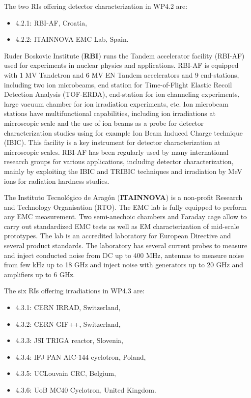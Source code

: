 The two RIs offering detector characterization in WP4.2 are:
\begin{itemize}
    \item	4.2.1: RBI-AF, Croatia,
    \item	4.2.2: ITAINNOVA EMC Lab, Spain.
\end{itemize}

Ruder Boskovic Institute (\textbf{RBI}) runs the Tandem accelerator facility (RBI-AF) used for experiments in nuclear physics and applications. RBI-AF is equipped with 1 MV Tandetron and 6 MV EN Tandem accelerators and 9 end-stations, including two ion microbeams, end station for Time-of-Flight Elastic Recoil Detection Analysis (TOF-ERDA), end-station for ion channeling experiments, large vacuum chamber for ion irradiation experiments, etc. Ion microbeam stations have multifunctional capabilities, including ion irradiations at microscopic scale and the use of ion beams as a probe for detector characterization studies using for example Ion Beam Induced Charge technique (IBIC). This facility is a key instrument for detector characterization at microscopic scales. RBI-AF has been regularly used by many international research groups for various applications, including detector characterization, mainly by exploiting the IBIC and TRIBIC techniques and irradiation by MeV ions for radiation hardness studies. 

The Instituto Tecnológico de Aragón (\textbf{ITAINNOVA}) is a non-profit Research and Technology Organisation (RTO). The EMC lab is fully equipped to perform any EMC measurement. Two
semi-anechoic chambers and Faraday cage allow to carry out standardized EMC tests as well as EM characterization of mid-scale prototypes. The lab is an accredited laboratory for European Directive and several product standards. The laboratory has several current probes to measure and inject conducted noise from DC up to 400 MHz, antennas to measure noise from few kHz up to 18 GHz and inject noise with generators up to 20 GHz and amplifiers up to 6 GHz.

The six RIs offering irradiations in WP4.3 are:
\begin{itemize}
    \item	4.3.1: CERN IRRAD, Switzerland,
    \item	4.3.2: CERN GIF++, Switzerland,
    \item	4.3.3: JSI TRIGA reactor, Slovenia,
    \item	4.3.4: IFJ PAN AIC-144 cyclotron, Poland,
    \item	4.3.5: UCLouvain CRC, Belgium,
    \item	4.3.6: UoB MC40 Cyclotron, United Kingdom.
\end{itemize}

